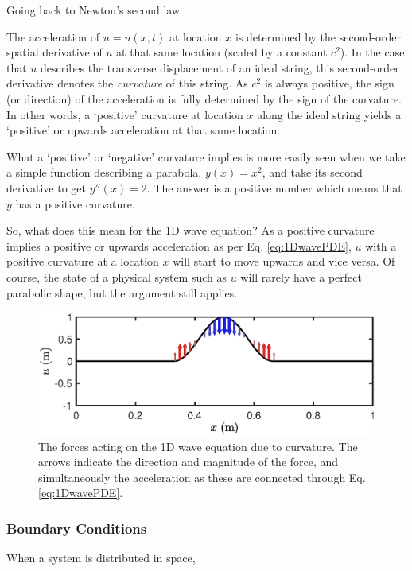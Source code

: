 Going back to Newton's second law

The acceleration of $u = u(x,t)$ at location $x$ is determined by the second-order spatial derivative of $u$ at that same location (scaled by a constant $c^2$). In the case that $u$ describes the transverse displacement of an ideal string, this second-order derivative denotes the \textit{curvature} of this string. As $c^2$ is always positive, the sign (or direction) of the acceleration is fully determined by the sign of the curvature. In other words, a `positive' curvature at location $x$ along the ideal string yields a `positive' or upwards acceleration at that same location. 

What a `positive' or `negative' curvature implies is more easily seen when we take a simple function describing a parabola, $y(x) = x^2$, and take its second derivative to get $y''(x) = 2$. The answer is a positive number which means that $y$ has a positive curvature. 

So, what does this mean for the 1D wave equation? As a positive curvature implies a positive or upwards acceleration as per Eq. \eqref{eq:1DwavePDE}, $u$ with a positive curvature at a location $x$ will start to move upwards and vice versa. Of course, the state of a physical system such as $u$ will rarely have a perfect parabolic shape, but the argument still applies. 

\begin{figure}[h]
    \centering
    \includegraphics[width=\textwidth]{figures/resonators/curvature.eps}
    \caption{\label{fig:curvature} The forces acting on the 1D wave equation due to curvature. The arrows indicate the direction and magnitude of the force, and simultaneously the acceleration as these are connected through Eq. \eqref{eq:1DwavePDE}.}
\end{figure}

\subsubsection{Boundary Conditions}
When a system is distributed in space, 

